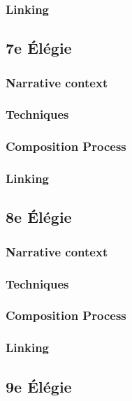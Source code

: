 \documentclass[12pt,twoside,maitrise]{dms}
\theoremstyle{definition}
\begin{document}
\subsubsection{Linking}

\subsection{7e Élégie}

\subsubsection{Narrative context}

\subsubsection{Techniques}

\subsubsection{Composition Process}

\subsubsection{Linking}

\subsection{8e Élégie}

\subsubsection{Narrative context}

\subsubsection{Techniques}

\subsubsection{Composition Process}

\subsubsection{Linking}

\subsection{9e Élégie}
\end{document}

